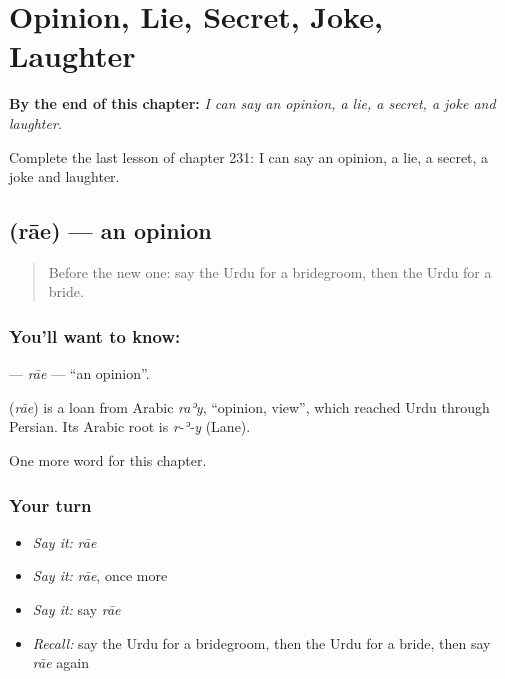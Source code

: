 
\chapter{Opinion, Lie, Secret, Joke, Laughter}
\label{ch:ur-opinion-lie-secret-joke-laughter}

\begin{chapteropening}
\textbf{By the end of this chapter:} \emph{I can say an opinion, a lie, a secret, a joke and laughter.}

Complete the last lesson of chapter 231: I can say an opinion, a lie, a secret, a joke and laughter.
\end{chapteropening}

\section[\texorpdfstring{\ur{رائے} (rāe)}{رائے (rāe)}]{ (rāe) — an opinion}

\label{lesson:UR-C231-rae}



\begin{quote}
Before the new one: say the Urdu for a bridegroom, then the Urdu for a bride.
\end{quote}

\subsection*{You'll want to know: }
\textbf{} — \emph{rāe} — \textquotedblleft{}an opinion\textquotedblright{}.

\begin{cousinweb}
\textbf{} (\emph{rāe}) is a loan from Arabic \emph{raʾy}, \textquotedblleft{}opinion, view\textquotedblright{}, which reached Urdu through Persian. Its Arabic root is \emph{r-ʾ-y} (Lane).
\end{cousinweb}

\begin{grammarlens}[title={What you've built}]
One more word for this chapter.
\end{grammarlens}

\subsection*{Your turn}
\begin{itemize}
\raggedright
  \item \emph{Say it:} \emph{rāe}
  \item \emph{Say it:} \emph{rāe}, once more
  \item \emph{Say it:} say \emph{rāe}
  \item \emph{Recall:} say the Urdu for a bridegroom, then the Urdu for a bride, then say \emph{rāe} again
\end{itemize}

